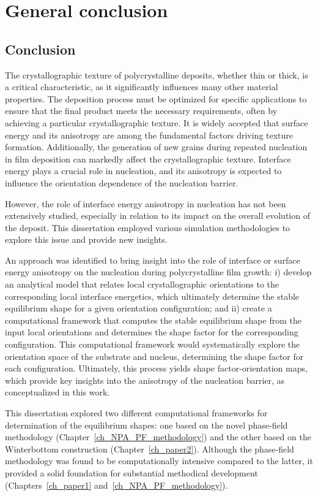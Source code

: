 \chapter{General conclusion} \label{ch_conclusion}
\section{Conclusion}
The crystallographic texture of polycrystalline deposits, whether thin or thick, is a critical characteristic, as it significantly influences many other material properties. The deposition process must be optimized for specific applications to ensure that the final product meets the necessary requirements, often by achieving a particular crystallographic texture. It is widely accepted that surface energy and its anisotropy are among the fundamental factors driving texture formation. Additionally, the generation of new grains during repeated nucleation in film deposition can markedly affect the crystallographic texture. Interface energy plays a crucial role in nucleation, and its anisotropy is expected to influence the orientation dependence of the nucleation barrier.

However, the role of interface energy anisotropy in nucleation has not been extensively studied, especially in relation to its impact on the overall evolution of the deposit. This dissertation employed various simulation methodologies to explore this issue and provide new insights.

An approach was identified to bring insight into the role of interface or surface energy anisotropy on the nucleation during polycrystalline film growth: i) develop an analytical model that relates local crystallographic orientations to the corresponding local interface energetics, which ultimately determine the stable equilibrium shape for a given orientation configuration; and ii) create a computational framework that computes the stable equilibrium shape from the input local orientations and determines the shape factor for the corresponding configuration. This computational framework would systematically explore the orientation space of the substrate and nucleus, determining the shape factor for each configuration. Ultimately, this process yields shape factor-orientation maps, which provide key insights into the anisotropy of the nucleation barrier, as conceptualized in this work.

This dissertation explored two different computational frameworks for determination of the equilibrium shapes: one based on the novel phase-field methodology (Chapter~\ref{ch_NPA_PF_methodology}) and the other based on the Winterbottom construction (Chapter~\ref{ch_paper2}). Although the phase-field methodology was found to be computationally intensive compared to the latter, it provided a solid foundation for substantial methodical development (Chapters~\ref{ch_paper1} and~\ref{ch_NPA_PF_methodology}).


